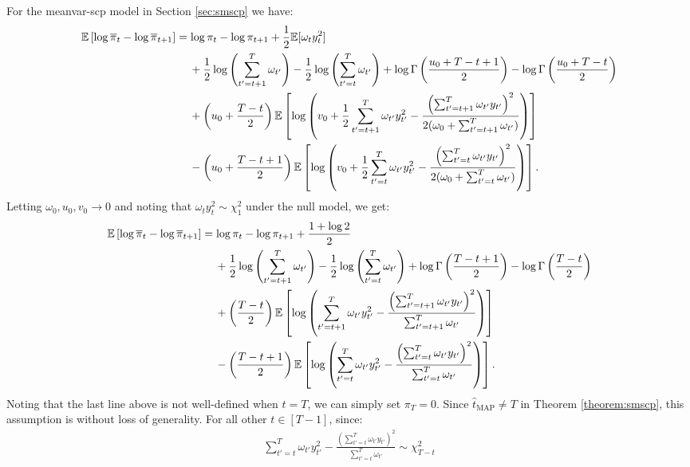 For the meanvar-scp model in Section \ref{sec:smscp} we have:
\small
\begin{align*}
    \mathbb{E}\left[\log\overline{\pi}_t - \log \overline{\pi}_{t+1} \right] &= \log \pi_t- \log \pi_{t+1} + \frac{1}{2} \mathbb{E}[\omega_ty_t^2] \\
    &\quad \: + \frac{1}{2}\log\left(\sum_{t'=t+1}^T \omega_{t'}\right) - \frac{1}{2}\log\left(\sum_{t'=t}^T \omega_{t'}\right) + \log \Gamma\left(\frac{u_0 + T-t+1}{2}\right) - \log \Gamma\left(\frac{u_0 + T-t}{2}\right)  \\
    &\quad \: + \left(u_0 + \frac{T - t}{2}\right)\mathbb{E}\left[\log\left(v_0 +\frac{1}{2}\sum_{t'=t+1}^T \omega_{t'}y_{t'}^2- \frac{\left(\sum_{t'=t+1}^T \omega_{t'}y_{t'}\right)^2}{2(\omega_0 + \sum_{t'=t+1}^T \omega_{t'})}\right)\right] \\
     &\quad \:- \left(u_0 + \frac{T - t +1}{2}\right)\mathbb{E}\left[\log\left(v_0 +\frac{1}{2}\sum_{t'=t}^T \omega_{t'}y_{t'}^2 - \frac{\left(\sum_{t'=t}^T \omega_{t'}y_{t'}\right)^2}{2(\omega_0 + \sum_{t'=t}^T \omega_{t'})}\right)\right].
\end{align*}
\normalsize
Letting $\omega_0, u_0,v_0 \to 0$ and noting that $\omega_{t}y^2_{t} \sim \chi^2_1$ under the null model, we get:
\small
\begin{align*}
    \mathbb{E}\left[\log\overline{\pi}_t - \log \overline{\pi}_{t+1} \right] &= \log \pi_t- \log \pi_{t+1} + \frac{1 + \log 2}{2} \\
    &\quad \: + \frac{1}{2}\log\left(\sum_{t'=t+1}^T \omega_{t'}\right) - \frac{1}{2}\log\left(\sum_{t'=t}^T \omega_{t'}\right) + \log \Gamma\left(\frac{ T-t+1}{2}\right) - \log \Gamma\left(\frac{T-t}{2}\right)  \\
    &\quad \: + \left(\frac{T - t}{2}\right)\mathbb{E}\left[\log\left(\sum_{t'=t+1}^T \omega_{t'}y_{t'}^2- \frac{\left(\sum_{t'=t+1}^T \omega_{t'}y_{t'}\right)^2}{\sum_{t'=t+1}^T \omega_{t'}}\right)\right] \\
     &\quad \:- \left(\frac{T - t +1}{2}\right)\mathbb{E}\left[\log\left(\sum_{t'=t}^T \omega_{t'}y_{t'}^2 - \frac{\left(\sum_{t'=t}^T \omega_{t'}y_{t'}\right)^2}{\sum_{t'=t}^T \omega_{t'}}\right)\right].
\end{align*}
\normalsize
Noting that the last line above is not well-defined when $t = T$, we can simply set $\pi_T = 0$. Since $\hat{t}_{\text{MAP}} \neq T$ in Theorem \ref{theorem:smscp}, this assumption is without loss of generality. For all other $t \in [T-1]$, since:
\begin{align*}
    \sum_{t'=t}^T \omega_{t'}y_{t'}^2 - \frac{\left(\sum_{t'=t}^T \omega_{t'}y_{t'}\right)^2}{\sum_{t'=t}^T \omega_{t'}} \sim \chi^2_{T-t}
\end{align*}
